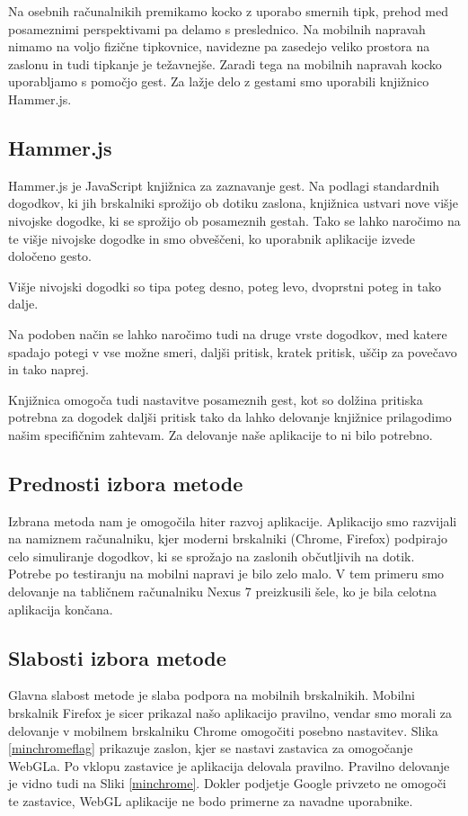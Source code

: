 Na osebnih računalnikih premikamo kocko z uporabo smernih tipk, prehod med posameznimi perspektivami pa delamo s preslednico. Na mobilnih napravah nimamo na voljo fizične tipkovnice, navidezne pa zasedejo veliko prostora na zaslonu in tudi tipkanje je težavnejše. Zaradi tega na mobilnih napravah kocko uporabljamo s pomočjo gest. Za lažje delo z gestami smo uporabili knjižnico Hammer.js.

\subsection*{Hammer.js}

Hammer.js je JavaScript knjižnica za zaznavanje gest. Na podlagi standardnih dogodkov, ki jih brskalniki sprožijo ob dotiku zaslona, knjižnica ustvari nove višje nivojske dogodke, ki se sprožijo ob posameznih gestah. Tako se lahko naročimo na te višje nivojske dogodke in smo obveščeni, ko uporabnik aplikacije izvede določeno gesto.

Višje nivojski dogodki so tipa poteg desno, poteg levo, dvoprstni poteg in tako dalje. 

Na podoben način se lahko naročimo tudi na druge vrste dogodkov, med katere spadajo potegi v vse možne smeri, daljši pritisk, kratek pritisk, uščip za povečavo in tako naprej.

Knjižnica omogoča tudi nastavitve posameznih gest, kot so dolžina pritiska potrebna za dogodek daljši pritisk tako da lahko delovanje knjižnice prilagodimo našim specifičnim zahtevam. Za delovanje naše aplikacije to ni bilo potrebno.

\subsection{Prednosti izbora metode}

Izbrana metoda nam je omogočila hiter razvoj aplikacije. Aplikacijo smo razvijali na namiznem računalniku, kjer moderni brskalniki (Chrome, Firefox) podpirajo celo simuliranje dogodkov, ki se sprožajo na zaslonih občutljivih na dotik. Potrebe po testiranju na mobilni napravi je bilo zelo malo. V tem primeru smo delovanje na tabličnem računalniku Nexus 7 preizkusili šele, ko je bila celotna aplikacija končana.

\subsection{Slabosti izbora metode}

Glavna slabost metode je slaba podpora na mobilnih brskalnikih. Mobilni brskalnik Firefox je sicer prikazal našo aplikacijo pravilno, vendar smo morali za delovanje v mobilnem brskalniku Chrome omogočiti posebno nastavitev. Slika \ref{minchromeflag} prikazuje zaslon, kjer se nastavi zastavica za omogočanje WebGLa. Po vklopu zastavice je aplikacija delovala pravilno. Pravilno delovanje je vidno tudi na Sliki \ref{minchrome}. Dokler podjetje Google privzeto ne omogoči te zastavice, WebGL aplikacije ne bodo primerne za navadne uporabnike.

